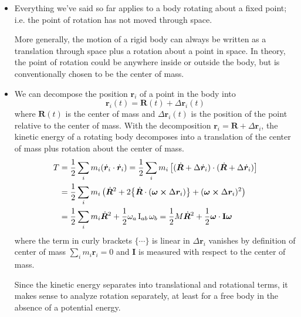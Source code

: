 \documentclass[11pt, a4paper]{article}
\newcommand{\bdot}[1]{\dot{\bm{#1}}}
\newcommand{\mat}[1]{\mathbf{#1}}
\begin{document}
\begin{itemize}
	\item Everything we've said so far applies to a body rotating about a fixed point; i.e. the point of rotation has not moved through space.
	
	More generally, the motion of a rigid body can always be written as a translation through space plus a rotation about a point in space. In theory, the point of rotation could be anywhere inside or outside the body, but is conventionally chosen to be the center of mass.
	
	\item We can decompose the position $ \bm{r}_{i} $ of a point in the body into
	\begin{equation*}
		\bm{r}_{i}(t) = \bm{R}(t) + \Delta \bm{r}_{i}(t)
	\end{equation*}
	where $ \bm{R}(t) $ is the center of mass and $ \Delta \bm{r}_{i}(t) $ is the position of the point relative to the center of mass.	With the decomposition $ \bm{r}_{i} = \bm{R} + \Delta \bm{r}_{i} $, the kinetic energy of a rotating body decomposes into a translation of the center of mass plus rotation about the center of mass.
	\begin{align*}
		T &= \frac{1}{2} \sum_{i} m_i (\dot{\bm{r}}_{i} \cdot \dot{\bm{r}}_{i}) = \frac{1}{2} \sum_{i} m_i \left [(\dot{\bm{R}} + \Delta \dot{\bm{r}}_{i}) \cdot (\dot{\bm{R}} + \Delta \dot{\bm{r}}_{i}) \right ]\\
		&= \frac{1}{2} \sum_{i} m_i \left(\dot{\bm{R}}^2 + 2\big \{ \dot{\bm{R}} \cdot (\bm{\omega} \cross \Delta \bm{r}_{i}) \big \} + (\bm{\omega} \cross \Delta \bm{r}_{i} )^2 \right)\\
		& = \frac{1}{2} \sum_{i} m_i \dot{\bm{R}}^{2} + \frac{1}{2} \omega_{a} \operatorname{I}_{ab} \omega_{b} = \frac{1}{2}M \bdot{R}^{2} + \frac{1}{2}\bm{\omega}\cdot \mat{I}\bm{\omega}
	\end{align*}
	where the term in curly brackets $ \{\cdots \} $ is linear in $ \Delta  \bm{r}_{i} $ vanishes by definition of center of mass $ \sum_{i}m_i \bm{r}_i = 0 $ and $ \mat{I} $ is measured with respect to the center of mass.
	
	Since the kinetic energy separates into translational and rotational terms, it makes sense to analyze rotation separately, at least for a free body in the absence of a potential energy.

\end{itemize}
\end{document}
